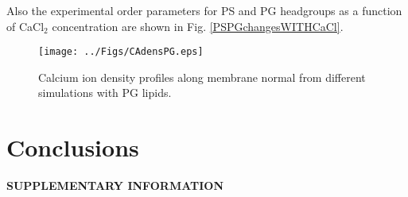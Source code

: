 \documentclass[aps,prl,superscriptaddress,twocolumn]{revtex4}
\begin{document}
Also the experimental order parameters for PS and PG headgroups
as a function of CaCl$_2$ concentration are shown in Fig. \ref{PSPGchangesWITHCaCl}.

\begin{figure}[]
  \centering
  \texttt{[image: ../Figs/CAdensPG.eps]}
  \caption{\label{CAdensPG}
    Calcium ion density profiles along membrane normal
    from different simulations with PG lipids.
  }
\end{figure}


\section{Conclusions}


%

\begin{acknowledgments}
\end{acknowledgments}
\newpage
\appendix
\begin{center}
{\bf SUPPLEMENTARY INFORMATION}
\end{center}



\end{document}
